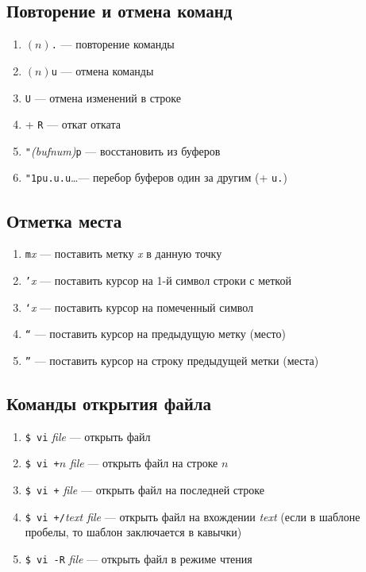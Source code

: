 \documentclass[a4paper,10pt, twocolumn]{article}
\newcommand*{\cod}[1]{\texttt{#1}}
\begin{document}
\subsection{Повторение и отмена команд}
\begin{enumerate}
    \item $(n)$\cod{.} --- повторение команды
    \item $(n)$\cod{u} --- отмена команды 
    \item \cod{U} --- отмена изменений в строке
    \item \Ctrl + \cod{R} --- откат отката
    \item \cod{"}\textit{(bufnum)}\cod{p} --- восстановить из буферов
    \item \cod{"1pu.u.u}\dots --- перебор буферов один за другим (+ \cod{u.}) 
\end{enumerate}

\subsection{Отметка места}
\begin{enumerate}
    \item \cod{m}\textit{x} --- поставить метку \textit{x} в данную точку
    \item \cod{'}\textit{x} --- поставить курсор на 1-й символ строки с меткой
    \item \cod{`}\textit{x} --- поставить курсор на помеченный символ
    \item \cod{``} --- поставить курсор на предыдущую метку (место)
    \item \cod{''} --- поставить курсор на строку предыдущей метки (места)
\end{enumerate}


\subsection{Команды открытия файла}
\begin{enumerate}
    \item \cod{\$ vi} \textit{file} --- открыть файл
    \item \cod{\$ vi +}$n$ \textit{file} --- открыть файл на строке $n$
    \item \cod{\$ vi +} \textit{file} --- открыть файл на последней строке
    \item \cod{\$ vi +/}\textit{text file} --- открыть файл на вхождении \textit{text}
    (если в шаблоне пробелы, то шаблон заключается в кавычки)
    \item \cod{\$ vi -R} \textit{file} --- открыть файл в режиме чтения
\end{enumerate}
\end{document}
